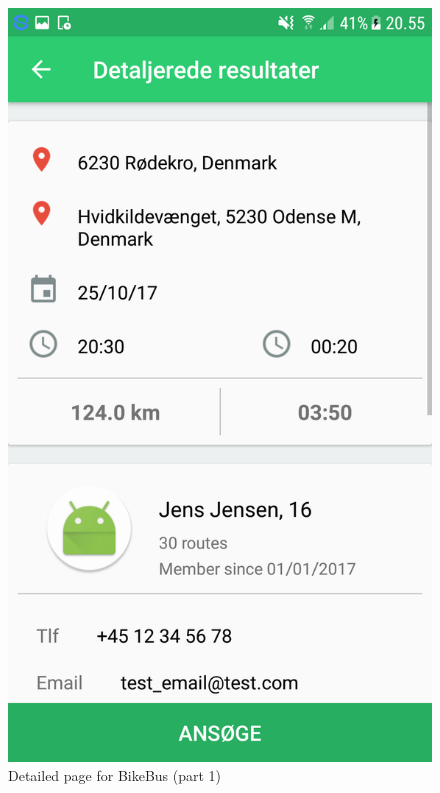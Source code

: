 \begin{figure}[!htb]
\begin{minipage}{0.32\textwidth}
    \includegraphics[width=\linewidth]{Graphics/Images/bikebus_detail_1.png}
    \caption{Detailed page for BikeBus (part 1)}
    \label{fig:sample_figure}
\end{minipage}\hfill
\begin{minipage}{0.32\textwidth}
\centering

\end{minipage}
\end{figure}
